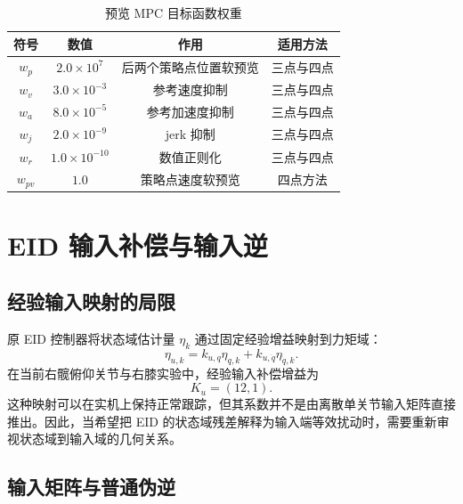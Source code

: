 \documentclass[12pt,a4paper]{ctexart}
\begin{document}
\begin{table}[htbp]
\centering
\caption{预览 MPC 目标函数权重}
\label{tab:mpc_weights}
\begin{tabular}{cccc}
\toprule
符号 & 数值 & 作用 & 适用方法 \\
\midrule
\(w_p\) & \(2.0\times10^{7}\) & 后两个策略点位置软预览 & 三点与四点 \\
\(w_v\) & \(3.0\times10^{-3}\) & 参考速度抑制 & 三点与四点 \\
\(w_a\) & \(8.0\times10^{-5}\) & 参考加速度抑制 & 三点与四点 \\
\(w_j\) & \(2.0\times10^{-9}\) & jerk 抑制 & 三点与四点 \\
\(w_r\) & \(1.0\times10^{-10}\) & 数值正则化 & 三点与四点 \\
\(w_{pv}\) & \(1.0\) & 策略点速度软预览 & 四点方法 \\
\bottomrule
\end{tabular}
\end{table}

\section{EID 输入补偿与输入逆}

\subsection{经验输入映射的局限}

原 EID 控制器将状态域估计量 \(\eta_k\) 通过固定经验增益映射到力矩域：
\[
    \eta_{u,k}=k_{u,q}\eta_{q,k}+k_{u,\dot q}\eta_{\dot q,k}.
\]
在当前右髋俯仰关节与右膝实验中，经验输入补偿增益为
\[
    K_u=(12,1).
\]
这种映射可以在实机上保持正常跟踪，但其系数并不是由离散单关节输入矩阵直接推出。因此，当希望把 EID 的状态域残差解释为输入端等效扰动时，需要重新审视状态域到输入域的几何关系。

\subsection{输入矩阵与普通伪逆}
\end{document}
